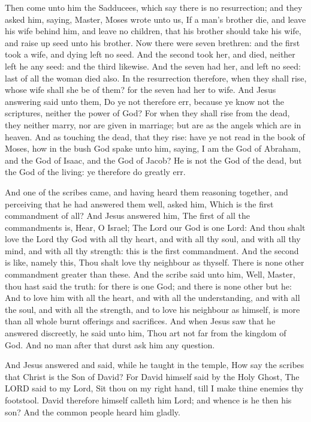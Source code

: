  Then come unto him the Sadducees, which say there is no
resurrection; and they asked him, saying,  Master, Moses
wrote unto us, If a man's brother die, and leave his wife behind him,
and leave no children, that his brother should take his wife, and raise
up seed unto his brother.  Now there were seven brethren:
and the first took a wife, and dying left no seed.  And
the second took her, and died, neither left he any seed: and the third
likewise.  And the seven had her, and left no seed: last
of all the woman died also.  In the resurrection
therefore, when they shall rise, whose wife shall she be of them? for
the seven had her to wife.  And Jesus answering said unto
them, Do ye not therefore err, because ye know not the scriptures,
neither the power of God?  For when they shall rise from
the dead, they neither marry, nor are given in marriage; but are as the
angels which are in heaven.  And as touching the dead,
that they rise: have ye not read in the book of Moses, how in the bush
God spake unto him, saying, I am the God of Abraham, and the God of
Isaac, and the God of Jacob?  He is not the God of the
dead, but the God of the living: ye therefore do greatly err.

 And one of the scribes came, and having heard them
reasoning together, and perceiving that he had answered them well, asked
him, Which is the first commandment of all?  And Jesus
answered him, The first of all the commandments is, Hear, O Israel; The
Lord our God is one Lord:  And thou shalt love the Lord
thy God with all thy heart, and with all thy soul, and with all thy
mind, and with all thy strength: this is the first commandment.
 And the second is like, namely this, Thou shalt love thy
neighbour as thyself. There is none other commandment greater than
these.  And the scribe said unto him, Well, Master, thou
hast said the truth: for there is one God; and there is none other but
he:  And to love him with all the heart, and with all the
understanding, and with all the soul, and with all the strength, and to
love his neighbour as himself, is more than all whole burnt offerings
and sacrifices.  And when Jesus saw that he answered
discreetly, he said unto him, Thou art not far from the kingdom of God.
And no man after that durst ask him any question.

 And Jesus answered and said, while he taught in the
temple, How say the scribes that Christ is the Son of David?
 For David himself said by the Holy Ghost, The LORD said
to my Lord, Sit thou on my right hand, till I make thine enemies thy
footstool.  David therefore himself calleth him Lord; and
whence is he then his son? And the common people heard him gladly.


